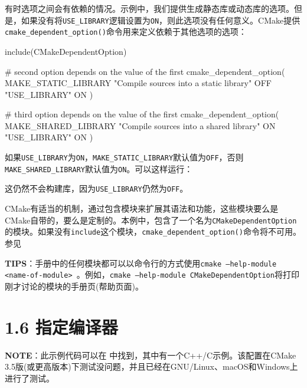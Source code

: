 
有时选项之间会有依赖的情况。示例中，我们提供生成静态库或动态库的选项。但是，如果没有将\texttt{USE\_LIBRARY}逻辑设置为\texttt{ON}，则此选项没有任何意义。CMake提供\texttt{cmake\_dependent\_option()}命令用来定义依赖于其他选项的选项：

\begin{codebox}[cmake]
include(CMakeDependentOption)

# second option depends on the value of the first
cmake_dependent_option(
    MAKE_STATIC_LIBRARY "Compile sources into a static library" OFF
    "USE_LIBRARY" ON
    )
    
# third option depends on the value of the first
cmake_dependent_option(
    MAKE_SHARED_LIBRARY "Compile sources into a shared library" ON
    "USE_LIBRARY" ON
    )
\end{codebox}

如果\texttt{USE\_LIBRARY}为\texttt{ON}，\texttt{MAKE\_STATIC\_LIBRARY}默认值为\texttt{OFF}，否则\texttt{MAKE\_SHARED\_LIBRARY}默认值为\texttt{ON}。可以这样运行：


这仍然不会构建库，因为\texttt{USE\_LIBRARY}仍然为\texttt{OFF}。

CMake有适当的机制，通过包含模块来扩展其语法和功能，这些模块要么是CMake自带的，要么是定制的。本例中，包含了一个名为\texttt{CMakeDependentOption}的模块。如果没有\texttt{include}这个模块，\texttt{cmake\_dependent\_option()}命令将不可用。参见 

\begin{myInfoBox}
\textbf{TIPS}：手册中的任何模块都可以以命令行的方式使用\texttt{cmake --help-module <name-of-module> }。例如，\texttt{cmake --help-module CMakeDependentOption}将打印刚才讨论的模块的手册页(帮助页面)。
\end{myInfoBox}


\section{1.6 指定编译器}

\begin{myInfoBox}
\textbf{NOTE}：此示例代码可以在  中找到，其中有一个C++/C示例。该配置在CMake 3.5版(或更高版本)下测试没问题，并且已经在GNU/Linux、macOS和Windows上进行了测试。
\end{myInfoBox}

